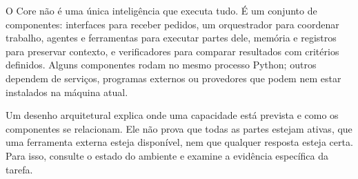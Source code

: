 \begin{conceito}
O Core não é uma única inteligência que executa tudo. É um conjunto de
componentes: interfaces para receber pedidos, um orquestrador para coordenar
trabalho, agentes e ferramentas para executar partes dele, memória e registros
para preservar contexto, e verificadores para comparar resultados com critérios
definidos. Alguns componentes rodam no mesmo processo Python; outros dependem
de serviços, programas externos ou provedores que podem nem estar instalados na
máquina atual.
\end{conceito}

\begin{aviso}
Um desenho arquitetural explica onde uma capacidade está prevista e como os
componentes se relacionam. Ele não prova que todas as partes estejam ativas,
que uma ferramenta externa esteja disponível, nem que qualquer resposta esteja
certa. Para isso, consulte o estado do ambiente e examine a evidência específica
da tarefa.
\end{aviso}


